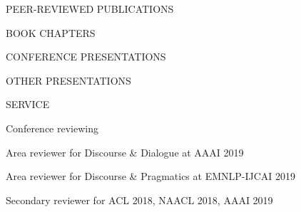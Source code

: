 \documentclass{resume} %
\begin{document}
\begin{rSection}{PEER-REVIEWED PUBLICATIONS}
\vspace{-4.7em}
\end{rSection}

\begin{rSection}{BOOK CHAPTERS}
\vspace{-4.7em}
\end{rSection}

\begin{rSection}{CONFERENCE PRESENTATIONS}
\vspace{-4.7em}
\end{rSection}

\begin{rSection}{OTHER PRESENTATIONS}
\vspace{-4.7em}
\end{rSection}

\newpage
\begin{rSection}{SERVICE} \itemsep -1pt {}
\vspace{-0.7em}
\begin{rSubsection}{Conference reviewing}{} 
{}{}
\item Area reviewer for Discourse \& Dialogue at AAAI 2019
\item Area reviewer for Discourse \& Pragmatics at EMNLP-IJCAI 2019
\item Secondary reviewer for ACL 2018, NAACL 2018, AAAI 2019
\end{rSubsection}
\end{rSection}
\end{document}

